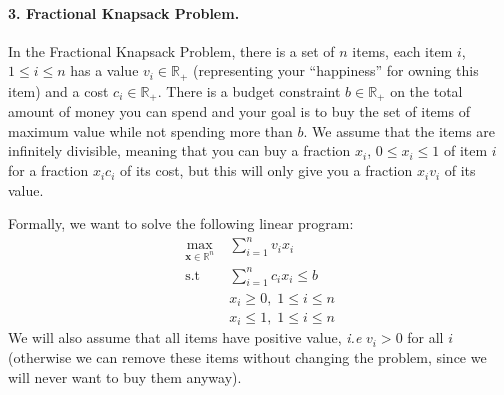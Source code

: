 \documentclass[11pt]{article}
\theoremstyle{remark}
\newcommand{\R}{\mathbb{R}}                     %
\newcommand{\bx}{\mathbf{x}}
\begin{document}
\paragraph{3.  Fractional Knapsack Problem.}
In the Fractional Knapsack Problem, there is a set of $n$ items, each item $i$,
$1\leq i\leq n$ has a value $v_i\in\R_+$ (representing your ``happiness'' for
owning this item) and a cost $c_i\in\R_+$. There is a budget constraint
$b\in\R_+$ on the total amount of money you can spend and your goal is to buy
the set of items of maximum value while not spending more than $b$. We assume
that the items are infinitely divisible, meaning that you can buy a fraction
$x_i$, $0\leq x_i \leq 1$ of item $i$ for a fraction $x_ic_i$ of its cost, but
this will only give you a fraction $x_iv_i$ of its value.

Formally, we want to solve the following linear program:
\begin{displaymath}
    \begin{aligned}
        \max_{\bx\in\R^n}&\; \sum_{i=1}^n v_ix_i\\
        \text{s.t} &\; \sum_{i=1}^n c_ix_i\leq b\\
                   &\; x_i\geq 0,\;1\leq i\leq n\\
                   &\; x_i\leq 1,\;1\leq i\leq n
    \end{aligned}
\end{displaymath}
We will also assume that all items have positive value, \emph{i.e} $v_i > 0$
for all $i$ (otherwise we can remove these items without changing the problem,
since we will never want to buy them anyway).
\end{document}
